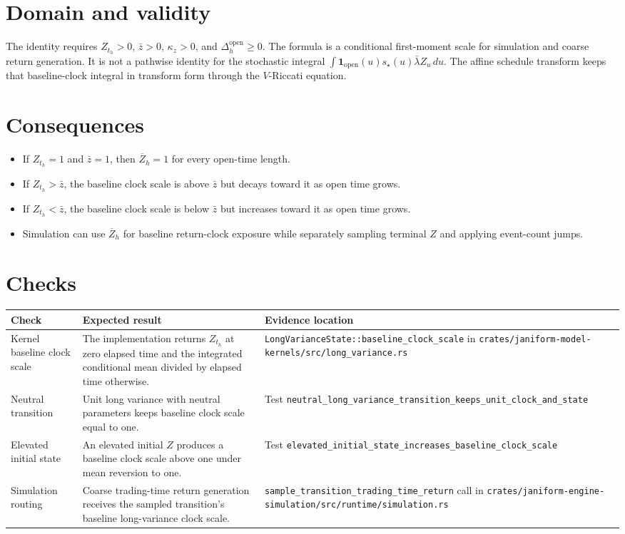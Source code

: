 \documentclass[11pt]{article}
\begin{document}
\section{Domain and validity}

The identity requires \(Z_{t_h}>0\), \(\bar z>0\), \(\kappa_z>0\), and
\(\Delta_h^{\mathrm{open}}\ge0\).
The formula is a conditional first-moment scale for simulation and coarse
return generation.
It is not a pathwise identity for the stochastic integral
\(\int \mathbf{1}_{\mathrm{open}}(u)s_\star(u)\bar\lambda Z_u\,du\).
The affine schedule transform keeps that baseline-clock integral in transform
form through the \(V\)-Riccati equation.

\section{Consequences}

\begin{itemize}
    \item If \(Z_{t_h}=1\) and \(\bar z=1\), then \(\overline Z_h=1\) for every open-time length.
    \item If \(Z_{t_h}>\bar z\), the baseline clock scale is above \(\bar z\) but decays toward it as open time grows.
    \item If \(Z_{t_h}<\bar z\), the baseline clock scale is below \(\bar z\) but increases toward it as open time grows.
    \item Simulation can use \(\overline Z_h\) for baseline return-clock exposure while separately sampling terminal \(Z\) and applying event-count jumps.
\end{itemize}

\section{Checks}

\begin{tabularx}{\textwidth}{XXX}
\toprule
Check & Expected result & Evidence location\\
\midrule
Kernel baseline clock scale
& The implementation returns \(Z_{t_h}\) at zero elapsed time and the integrated conditional mean divided by elapsed time otherwise.
& \texttt{LongVarianceState::baseline\_clock\_scale} in \texttt{crates/janiform-model-kernels/src/long\_variance.rs}\\
Neutral transition
& Unit long variance with neutral parameters keeps baseline clock scale equal to one.
& Test \texttt{neutral\_long\_variance\_transition\_keeps\_unit\_clock\_and\_state}\\
Elevated initial state
& An elevated initial \(Z\) produces a baseline clock scale above one under mean reversion to one.
& Test \texttt{elevated\_initial\_state\_increases\_baseline\_clock\_scale}\\
Simulation routing
& Coarse trading-time return generation receives the sampled transition's baseline long-variance clock scale.
& \texttt{sample\_transition\_trading\_time\_return} call in \texttt{crates/janiform-engine-simulation/src/runtime/simulation.rs}\\
\bottomrule
\end{tabularx}
\end{document}
